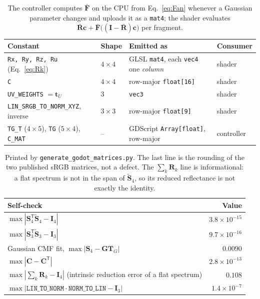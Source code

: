 \documentclass[11pt,a4paper]{article}
\newcommand{\mS}{\mathbf{S}}
\newcommand{\mSd}{\tilde{\mathbf{S}}}
\newcommand{\mR}{\mathbf{R}}
\newcommand{\mRb}{\bar{\mathbf{R}}}
\newcommand{\mFb}{\bar{\mathbf{F}}}
\newcommand{\mC}{\mathbf{C}}
\newcommand{\mG}{\mathbf{G}}
\newcommand{\mTG}{\mathbf{T}_{\!G}}
\newcommand{\mI}{\mathbf{I}}
\newcommand{\vc}{\mathbf{c}}
\newcommand{\transp}{^{\mathsf{T}}}
\newcommand{\file}[1]{\texttt{#1}}
\newcommand{\code}[1]{\texttt{#1}}
\begin{document}
\begin{table}[h]\centering\small
\begin{tabular}{@{}llll@{}}
\toprule
Constant & Shape & Emitted as & Consumer \\
\midrule
\code{Rx, Ry, Rz, Ru} (Eq.~\ref{eq:Rk}) & $4\times4$ & GLSL \code{mat4}, each \code{vec4} one \emph{column} & shader \\
\code{C} & $4\times4$ & row-major \code{float[16]} & shader \\
\code{UV\_WEIGHTS} $=\mathbf t_U$ & 3 & \code{vec3} & shader \\
\code{LIN\_SRGB\_TO\_NORM\_XYZ}, inverse & $3\times3$ & row-major \code{float[9]} & shader \\
\code{TG\_T} ($4\times5$), \code{TG} ($5\times4$), \code{C\_MAT} & -- & GDScript \code{Array[float]}, row-major & controller \\
\bottomrule
\end{tabular}
\caption{The controller computes $\mFb$ on the CPU from Eq.~\eqref{eq:Fan}
whenever a Gaussian parameter changes and uploads it as a \code{mat4}; the
shader evaluates $\mRb\vc + \mFb\big((\mI-\mRb)\vc\big)$ per fragment.}
\label{tab:layout}
\end{table}

\begin{table}[h]\centering\small
\begin{tabular}{@{}lr@{}}
\toprule
Self-check & Value \\
\midrule
$\max|\mS_4\transp\mSd_4-\mI_4|$ & $3.8\times10^{-15}$ \\
$\max|\mS_3\transp\mSd_3-\mI_3|$ & $9.7\times10^{-16}$ \\
Gaussian CMF fit, $\max|\mS_4-\mG\mTG|$ & $0.0090$ \\
$\max|\mC-\mC\transp|$ & $2.8\times10^{-13}$ \\
$\max|\sum_k\mR_k-\mI_4|$ (intrinsic reduction error of a flat spectrum) & $0.108$ \\
$\max|\code{LIN\_TO\_NORM}\cdot\code{NORM\_TO\_LIN}-\mI_3|$ & $1.4\times10^{-7}$ \\
\bottomrule
\end{tabular}
\caption{Printed by \file{generate\_godot\_matrices.py}.  The last line is the
rounding of the two published sRGB matrices, not a defect.  The
$\sum_k\mR_k$ line is informational: a flat spectrum is not in the span of
$\mSd_4$, so its reduced reflectance is not exactly the identity.}
\label{tab:selfchecks}
\end{table}
\end{document}
